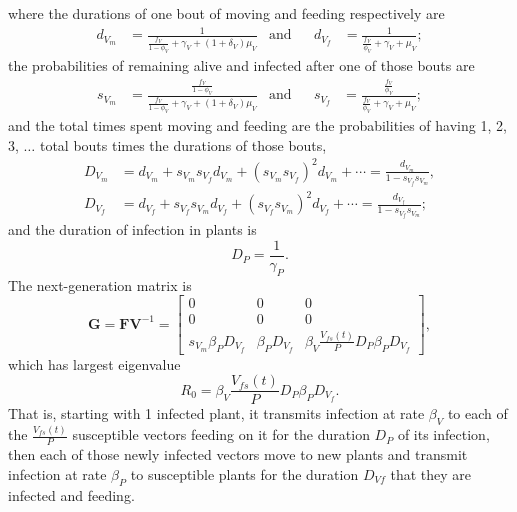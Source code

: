 \documentclass{article}
\newcommand{\mat}[1]{\mathbf{#1}}
\begin{document}
where the durations of one bout of moving and feeding respectively are
\begin{align}
  d_{V_m} &= \frac{1}{\frac{f_V}{1 - \phi_V} + \gamma_V + (1 + \delta_V) \mu_V}
  & \text{and} & &
  d_{V_f} &= \frac{1}{\frac{f_V}{\phi_V} + \gamma_V + \mu_V};
\end{align}
the probabilities of remaining alive and infected after one of those
bouts are
\begin{align}
  s_{V_m} &= \frac{\frac{f_V}{1 - \phi_V}}{\frac{f_V}{1 - \phi_V} + \gamma_V + (1 + \delta_V) \mu_V}
  & \text{and} & &
  s_{V_f} &= \frac{\frac{f_V}{\phi_V}}{\frac{f_V}{\phi_V} + \gamma_V + \mu_V};
\end{align}
and the total times spent moving and feeding are the probabilities of
having 1, 2, 3, $\ldots$ total bouts times the durations of those
bouts,
\begin{equation}
  \begin{split}
    D_{V_m} &= d_{V_m} + s_{V_m} s_{V_f} d_{V_m}
    + \left(s_{V_m} s_{V_f}\right)^2 d_{V_m} + \cdots
    = \frac{d_{V_m}}{1 - s_{V_f} s_{V_m}},
    \\
    D_{V_f} &= d_{V_f} + s_{V_f} s_{V_m} d_{V_f}
    + \left(s_{V_f} s_{V_m}\right)^2 d_{V_f} + \cdots
    = \frac{d_{V_f}}{1 - s_{V_f} s_{V_m}};
  \end{split}
\end{equation}
and the duration of infection in plants is
\begin{equation}
  D_P = \frac{1}{\gamma_P}.
\end{equation}
The next-generation matrix is 
\begin{equation}
  \mat{G} = \mat{F} \mat{V}^{-1} =
  \begin{bmatrix}
    0 & 0 & 0 \\
    0 & 0 & 0 \\
    s_{V_m} \beta_P D_{V_f} & \beta_P D_{V_f}
    & \beta_V \frac{V_{fs}(t)}{P} D_P \beta_P D_{V_f}
  \end{bmatrix},
\end{equation}
which has largest eigenvalue
\begin{equation}
  R_0 = \beta_V \frac{V_{fs}(t)}{P} D_P \beta_P D_{V_f}.
\end{equation}
That is, starting with 1 infected plant, it transmits infection at
rate $\beta_V$ to each of the $\frac{V_{fs}(t)}{P}$ susceptible vectors
feeding on it for the duration $D_P$ of its infection, then each of
those newly infected vectors move to new plants and transmit infection
at rate $\beta_P$ to susceptible plants for the duration $D_{Vf}$ that
they are infected and feeding.
\end{document}
